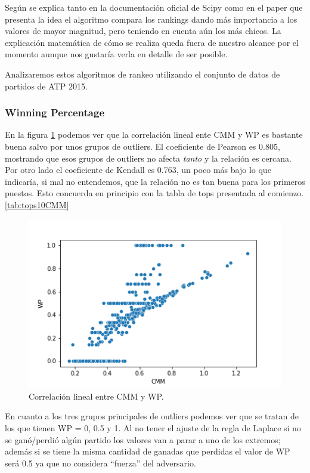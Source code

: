 Según se explica tanto en la documentación oficial de Scipy como en el paper que presenta la idea \cite{kendall} el algoritmo compara los rankings dando más importancia a los valores de mayor magnitud, pero teniendo en cuenta aún los más chicos. La explicación matemática de cómo se realiza queda fuera de nuestro alcance por el momento aunque nos gustaría verla en detalle de ser posible.

Analizaremos estos algoritmos de rankeo utilizando el conjunto de datos de partidos de ATP 2015\cite{repoAtp}.

\FloatBarrier
\subsubsection{Winning Percentage}

En la figura \ref{fig:sc_cmm_wp} podemos ver que la correlación lineal ente CMM y WP es bastante buena salvo por unos grupos de outliers. El coeficiente de Pearson es 0.805, mostrando que esos grupos de outliers no afecta \textit{tanto} y la relación es cercana. Por otro lado el coeficiente de Kendall es 0.763, un poco más bajo lo que indicaría, si mal no entendemos, que la relación no es tan buena para los primeros puestos. Esto concuerda en principio con la tabla de tops presentada al comienzo.\ref{tab:tops10CMM}

\begin{figure}[h]
 \centering
 \includegraphics[scale=0.8]{imagenes/scatterplot_CMM_WP.png}
 \caption{Correlación lineal entre CMM y WP.}
 \label{fig:sc_cmm_wp}
\end{figure}

En cuanto a los tres grupos principales de outliers podemos ver que se tratan de los que tienen WP = 0, 0.5 y 1. Al no tener el ajuste de la regla de Laplace si no se ganó/perdió algún partido los valores van a parar a uno de los extremos; además si se tiene la misma cantidad de ganadas que perdidas el valor de WP será 0.5 ya que no considera ``fuerza'' del adversario.\\

